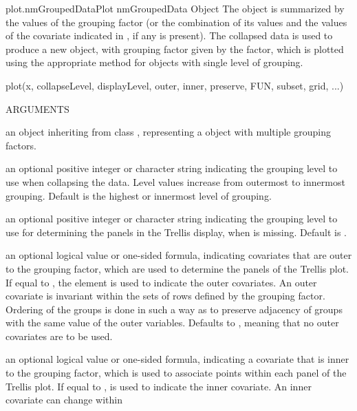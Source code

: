 \documentclass[pdftex]{article} \usepackage{url,graphicx}
\begin{document}
\begin{Helpfile}{plot.nmGroupedData}{Plot nmGroupedData Object}
The  object is summarized by the values of the
 grouping factor (or the combination of its values
and the values of the covariate indicated in , if any is
present). The collapsed data is used to produce a new
 object, with grouping factor given by the
 factor, which is plotted using the
appropriate  method for  objects with
single level of grouping.
\begin{Example}
plot(x, collapseLevel, displayLevel, outer, inner, preserve, 
     FUN, subset, grid, ...) 
\end{Example}
\begin{Argument}{ARGUMENTS}
\item[\Co{x:}]
an object inheriting from class ,
representing a  object with multiple grouping
factors.
\item[\Co{collapseLevel:}]
an optional positive integer or character string
indicating the grouping level to use when collapsing the data. Level
values increase from outermost to innermost grouping. Default is the
highest or innermost level of grouping.
\item[\Co{displayLevel:}]
an optional positive integer or character string
indicating the grouping level to use for determining the panels in
the Trellis display, when  is missing. Default is
.
\item[\Co{outer:}]
an optional logical value or one-sided formula,
indicating covariates that are outer to the 
grouping factor, which are used to determine the panels of the
Trellis plot. If equal to , the 
element  is used to indicate the 
outer covariates. An outer covariate is invariant within the sets
of rows defined by the grouping factor.  Ordering of the groups is
done in such a way as to preserve adjacency of groups with the same
value of the outer variables. Defaults to , meaning that
no outer covariates are to be used.
\item[\Co{inner:}]
an optional logical value or one-sided formula, indicating
a covariate that is inner to the  grouping factor,
which is used to associate points within each panel of the Trellis
plot. If equal to ,  is used
to indicate the inner covariate. An inner covariate can change within

\end{Argument}
\end{Helpfile}
\end{document}
